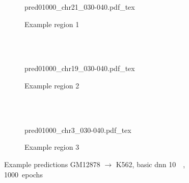 \begin{figure}[p]
    \begin{subfigure}{\textwidth}
        \centering
        \scriptsize
        {pred01000_chr21_030-040.pdf_tex}
        \caption{Example  region 1} \label{fig:results:basic10k_r1}
    \end{subfigure}\\[2mm]
    \\[3mm]
    \begin{subfigure}{\textwidth}
        \centering
        \scriptsize
        {pred01000_chr19_030-040.pdf_tex}
        \caption{Example region 2} \label{fig:results:basic10k_r2}
    \end{subfigure}\\[2mm]
    \\[3mm]
    \begin{subfigure}{\textwidth}
        \centering
        \scriptsize
        {pred01000_chr3_030-040.pdf_tex}
        \caption{Example region 3} \label{fig:results:basic10k_r3}
    \end{subfigure}
    \caption{Example predictions GM12878 $\rightarrow$ K562, basic \acrshort{dnn} \SI{10}{\kilo\bp}, 1000~epochs}
    \label{fig:results:basic10k_matrices}
\end{figure}
\clearpage

